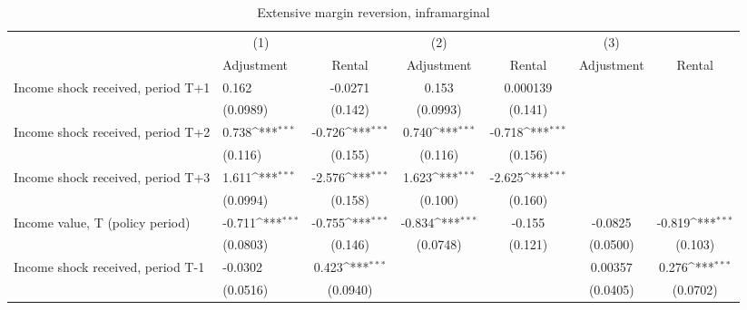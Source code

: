 \begin{table}[htbp]\centering
\def\sym#1{\ifmmode^{#1}\else\(^{#1}\)\fi}
\caption{Extensive margin reversion, inframarginal}
\begin{tabular}{p{0.8in}l*{5}{c}}
\hline\hline
                    &\multicolumn{1}{c}{(1)}         &                     &\multicolumn{1}{c}{(2)}         &                     &\multicolumn{1}{c}{(3)}         &                     \\
                    &  Adjustment         &      Rental         &  Adjustment         &      Rental         &  Adjustment         &      Rental         \\
\hline
Income shock received, period T+1&       0.162         &     -0.0271         &       0.153         &    0.000139         &                     &                     \\
                    &    (0.0989)         &     (0.142)         &    (0.0993)         &     (0.141)         &                     &                     \\
Income shock received, period T+2&       0.738\sym{***}&      -0.726\sym{***}&       0.740\sym{***}&      -0.718\sym{***}&                     &                     \\
                    &     (0.116)         &     (0.155)         &     (0.116)         &     (0.156)         &                     &                     \\
Income shock received, period T+3&       1.611\sym{***}&      -2.576\sym{***}&       1.623\sym{***}&      -2.625\sym{***}&                     &                     \\
                    &    (0.0994)         &     (0.158)         &     (0.100)         &     (0.160)         &                     &                     \\
Income value, T (policy period)&      -0.711\sym{***}&      -0.755\sym{***}&      -0.834\sym{***}&      -0.155         &     -0.0825         &      -0.819\sym{***}\\
                    &    (0.0803)         &     (0.146)         &    (0.0748)         &     (0.121)         &    (0.0500)         &     (0.103)         \\
Income shock received, period T-1&     -0.0302         &       0.423\sym{***}&                     &                     &     0.00357         &       0.276\sym{***}\\
                    &    (0.0516)         &    (0.0940)         &                     &                     &    (0.0405)         &    (0.0702)         \\

\end{tabular}
\end{table}
